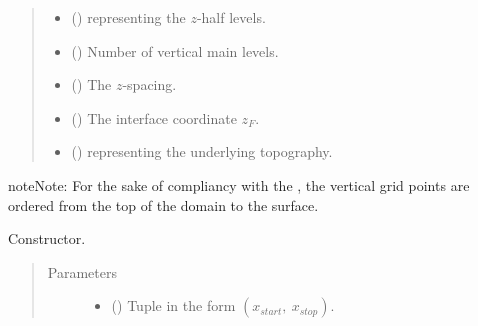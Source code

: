 \documentclass[letterpaper,10pt,english]{sphinxmanual}
\begin{document}
\begin{fulllineitems}
\begin{quote}
\begin{description}
\begin{itemize}
\item {} 
 () \textendash{} {\hyperref[\detokenize{api:grids.axis.Axis}]{}} representing the \(z\)-half levels.

\item {} 
 () \textendash{} Number of vertical main levels.

\item {} 
 () \textendash{} The \(z\)-spacing.

\item {} 
 () \textendash{} The interface coordinate \(z_F\).

\item {} 
{\hyperref[\detokenize{api:module-grids.topography}]{}} () \textendash{}  representing the underlying topography.

\end{itemize}

\end{description}\end{quote}

\begin{sphinxadmonition}{note}{Note:}
For the sake of compliancy with the , the vertical grid points are ordered
from the top of the domain to the surface.
\end{sphinxadmonition}

\begin{fulllineitems}
\label{\detokenize{api:grids.grid_xyz.GridXYZ.__init__}}
Constructor.
\begin{quote}\begin{description}
\item[{Parameters}] \leavevmode\begin{itemize}
\item {} 
 () \textendash{} Tuple in the form \((x_{start}, ~ x_{stop})\).


\end{itemize}
\end{description}
\end{quote}
\end{fulllineitems}
\end{fulllineitems}
\end{document}
